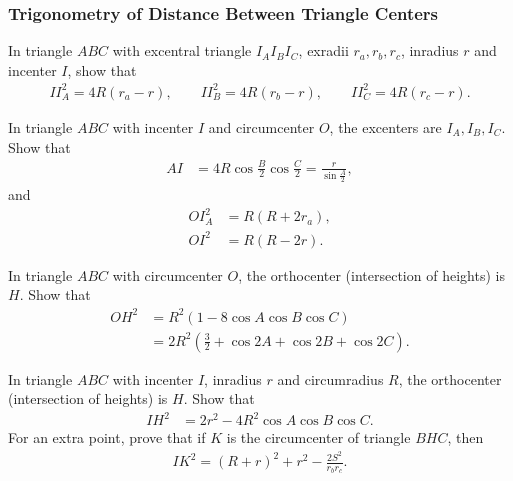 \documentclass[12pt,a4paper]{memoir}
\theoremstyle{definition}
\begin{document}
\subsubsection{Trigonometry of Distance Between Triangle Centers}

\begin{question}[name=Distance Between Incenter and Excenters]
	In triangle $ABC$ with excentral triangle $I_AI_BI_C$, exradii $r_a,r_b,r_c$, inradius $r$ and incenter $I$, show that
	\begin{align*}
		II_A^2 = 4R(r_a-r), \qquad II_B^2 = 4R(r_b-r), \qquad II_C^2 = 4R(r_c-r).
	\end{align*}
\end{question}



\begin{question}[name=Distance Between Circumcenter and Incenter]
	In triangle $ABC$ with incenter $I$ and circumcenter $O$, the excenters are $I_A,I_B,I_C$. Show that
	\begin{align*}
		AI &=4R\cos\frac{B}{2}\cos\frac{C}{2}=\frac{r}{\displaystyle\sin\frac{A}{2}},
	\end{align*}
	and
	\begin{align*}
		OI_A^2 &= R(R+2r_a),\\
		OI^2 &= R(R-2r).            
	\end{align*}
\end{question}




\begin{question}[name=Distance Between Circumcenter and Orthocenter]
	In triangle $ABC$ with circumcenter $O$, the orthocenter (intersection of heights) is $H$. Show that
	\begin{align*}
		OH^2 &= R^2(1-8\cos A \cos B \cos C)\\
		&= 2R^2\left(\frac{3}{2} + \cos 2A + \cos 2B + \cos 2C\right).
	\end{align*}
\end{question}





\begin{question}[name=Distance Between Incenter and Orthocenter]
	In triangle $ABC$ with incenter $I$, inradius $r$ and circumradius $R$, the orthocenter (intersection of heights) is $H$. Show that
	\begin{align*}
		IH^2 &= 2r^2 - 4R^2\cos A \cos B \cos C.
	\end{align*}
	For an extra point, prove that if $K$ is the circumcenter of triangle $BHC$, then
	\begin{align*}
		IK^2 = (R+r)^2 + r^2 - \frac{2S^2}{r_br_c}.
	\end{align*}
\end{question}
\end{document}
